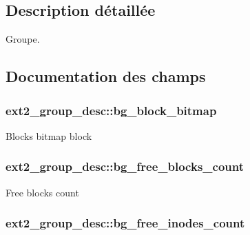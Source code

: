 \subsection{Description détaillée}
Groupe. 

\subsection{Documentation des champs}
\hypertarget{structext2__group__desc_a57481ebe34986e28812cc9b4e122c016}{
\subsubsection[{bg\-\_\-block\-\_\-bitmap}]{ ext2\-\_\-group\-\_\-desc\-::bg\-\_\-block\-\_\-bitmap}}\label{structext2__group__desc_a57481ebe34986e28812cc9b4e122c016}
Blocks bitmap block \hypertarget{structext2__group__desc_af1cf7574780c76da67e973179f6edd43}{
\subsubsection[{bg\-\_\-free\-\_\-blocks\-\_\-count}]{ ext2\-\_\-group\-\_\-desc\-::bg\-\_\-free\-\_\-blocks\-\_\-count}}\label{structext2__group__desc_af1cf7574780c76da67e973179f6edd43}
Free blocks count \hypertarget{structext2__group__desc_a5488cd2eb4ea863ca9d15a5df8da6bab}{
\subsubsection[{bg\-\_\-free\-\_\-inodes\-\_\-count}]{ ext2\-\_\-group\-\_\-desc\-::bg\-\_\-free\-\_\-inodes\-\_\-count}}\label{structext2__group__desc_a5488cd2eb4ea863ca9d15a5df8da6bab}
